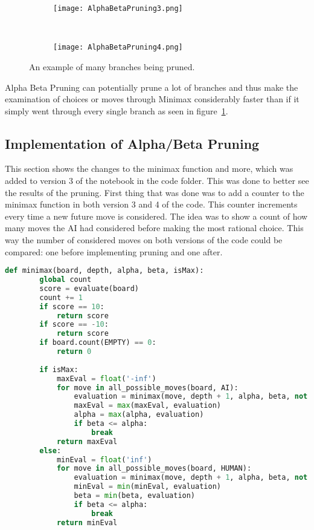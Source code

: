 \begin{figure}[!t]
    \centering %
    \begin{subfigure}[t]{0.3\textwidth}
        \texttt{[image: AlphaBetaPruning3.png]}
    \end{subfigure}
    ~
    \begin{subfigure}[t]{0.3\textwidth}
        \texttt{[image: AlphaBetaPruning4.png]}
    \end{subfigure}
    \caption{An example of many branches being pruned.} %
    \label{fig:AlphaBetaPruningB}
  \end{figure}

Alpha Beta Pruning can potentially prune a lot of branches and 
thus make the examination of choices or moves through Minimax considerably faster 
than if it simply went through every single branch as seen in figure~\ref{fig:AlphaBetaPruningB}.

\subsection{Implementation of Alpha/Beta Pruning}
\label{subsec:Implementation of Alpha/Beta Pruning}

This section shows the changes to the minimax function and more, which was added to version 3 of the notebook in the code folder. This was done to better see the results of the pruning. 
First thing that was done was to add a counter to the minimax function in both version 3 and 4 of the code. This counter increments every time a new future move is considered. 
The idea was to show a count of how many moves the AI had considered before making the most rational choice. This way the number of considered moves on both versions of the code could be compared:
one before implementing pruning and one after.

\begin{lstlisting}[language=python, caption={python example}, label={Script}, basicstyle=\ttfamily\small]
    def minimax(board, depth, alpha, beta, isMax):
        global count 
        score = evaluate(board)
        count += 1
        if score == 10: 
            return score
        if score == -10:
            return score
        if board.count(EMPTY) == 0:
            return 0
        
        if isMax:
            maxEval = float('-inf')
            for move in all_possible_moves(board, AI):
                evaluation = minimax(move, depth + 1, alpha, beta, not isMax)
                maxEval = max(maxEval, evaluation)
                alpha = max(alpha, evaluation)
                if beta <= alpha:
                    break
            return maxEval
        else:
            minEval = float('inf')
            for move in all_possible_moves(board, HUMAN):
                evaluation = minimax(move, depth + 1, alpha, beta, not isMax)
                minEval = min(minEval, evaluation)
                beta = min(beta, evaluation)
                if beta <= alpha:
                    break
            return minEval
\end{lstlisting}

